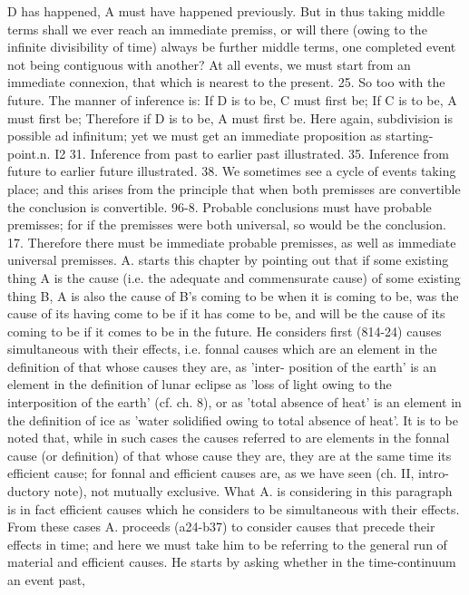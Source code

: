 {{{{{{{{{{{{{{{{{{{{{{{{{{{{{{{{{{{{{{{{{{{{{{{{{{{{{{{{{{{{{{{D has happened, A must have happened previously. But in
thus taking middle terms shall we ever reach an immediate
premiss, or will there (owing to the infinite divisibility of time)
always be further middle terms, one completed event not being
contiguous with another? At all events, we must start from an
immediate connexion, that which is nearest to the present.
25. So too with the future. The manner of inference is: If
D is to be, C must first be; If C is to be, A must first be; Therefore
if D is to be, A must first be. Here again, subdivision is possible
ad infinitum; yet we must get an immediate proposition as
starting-point.n.
I2
31. Inference from past to earlier past illustrated.
35. Inference from future to earlier future illustrated.
38. We sometimes see a cycle of events taking place; and this
arises from the principle that when both premisses are convertible
the conclusion is convertible.
96-8. Probable conclusions must have probable premisses; for
if the premisses were both universal, so would be the conclusion.
17. Therefore there must be immediate probable premisses,
as well as immediate universal premisses.
A. starts this chapter by pointing out that if some existing
thing A is the cause (i.e. the adequate and commensurate cause)
of some existing thing B, A is also the cause of B's coming to
be when it is coming to be, was the cause of its having come to
be if it has come to be, and will be the cause of its coming to be
if it comes to be in the future. He considers first (814-24) causes
simultaneous with their effects, i.e. fonnal causes which are an
element in the definition of that whose causes they are, as 'inter-
position of the earth' is an element in the definition of lunar
eclipse as 'loss of light owing to the interposition of the earth'
(cf. ch. 8), or as 'total absence of heat' is an element in the
definition of ice as 'water solidified owing to total absence of
heat'.
It is to be noted that, while in such cases the causes referred
to are elements in the fonnal cause (or definition) of that whose
cause they are, they are at the same time its efficient cause; for
fonnal and efficient causes are, as we have seen (ch. II, intro-
ductory note), not mutually exclusive. What A. is considering
in this paragraph is in fact efficient causes which he considers
to be simultaneous with their effects.
From these cases A. proceeds (a24-b37) to consider causes that
precede their effects in time; and here we must take him to be
referring to the general run of material and efficient causes. He
starts by asking whether in the time-continuum an event past,
}}}}}}}}}}}}}}}}}}}}}}}}}}}}}}}}}}}}}}}}}}}}}}}}}}}}}}}}}}}}}}}
